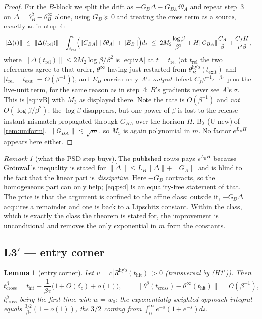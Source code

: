 \documentclass[11pt]{article}
\newtheorem{lemma}{Lemma}
\theoremstyle{definition}
\theoremstyle{remark}
\newtheorem{remark}{Remark}
\newcommand{\hyb}{\mathrm{hyb}}
\newcommand{\thit}{t_{\mathrm{hit}}}
\newcommand{\texit}{t_{\mathrm{exit}}}
\newcommand{\trel}{t_{\mathrm{rel}}}
\newcommand{\tcross}{t_{\mathrm{cross}}}
\begin{document}
\begin{proof}
For the $B$-block we split the drift as $-G_B\Delta-G_{BA}\delta\theta_A$ and
repeat step~3 on $\Delta=\theta_B^\beta-\theta_B^\infty$ alone, using
$G_B\succeq0$ and treating the cross term as a source, exactly as in step~4:
\[
\|\Delta(t)\|\ \le\ \|\Delta(\trel)\|
+\int_{\trel}^{t}\Bigl(\|G_{BA}\|\,\|\delta\theta_A\|+\|E_B\|\Bigr)ds
\ \le\ 2M_2\frac{\log\beta}{\beta^{2}}
+H\|G_{BA}\|\frac{C_A}{\beta}+\frac{C_fH}{v'\beta},
\]
where $\|\Delta(\trel)\|\le2M_2\log\beta/\beta^2$ is \eqref{eq:ivA} at $t=\trel$
(at $\trel$ the two references agree to that order, $\theta^\infty$ having just
restarted from $\theta_B^{\hyb}(\texit)$ and $|\trel-\texit|=O(\beta^{-1})$), and
$E_B$ carries only $A$'s \emph{output} defect $C_f\beta^{-1}e^{-\beta z}$ plus
the live-unit term, for the same reason as in step~4: $B$'s gradients never see
$A$'s $\sigma$. This is \eqref{eq:ivB} with $M_3$ as displayed there. Note the
rate is $O(\beta^{-1})$ and \emph{not} $O(\log\beta/\beta^2)$: the $\log\beta$
disappears, but one power of $\beta$ is lost to the release-instant mismatch
propagated through $G_{BA}$ over the horizon $H$. By (U-new) of
\cref{rem:uniform}, $\|G_{BA}\|\lesssim\sqrt m$, so $M_3$ is again polynomial in
$m$. No factor $e^{L_BH}$ appears here either.
\end{proof}

\begin{remark}[what the PSD step buys]\label{rem:psd}
The published route pays $e^{L_BH}$ because Gr\"onwall's inequality is stated for
$\|\dot\Delta\|\le L_B\|\Delta\|+\|G_A\|$ and is blind to the fact that the
linear part is \emph{dissipative}. Here $-G_B$ contracts, so the homogeneous part
can only help; \eqref{eq:psd} is an equality-free statement of that. The price is
that the argument is confined to the affine class: outside it, $-G_B\Delta$
acquires a remainder and one is back to a Lipschitz constant. Within the class,
which is exactly the class the theorem is stated for, the improvement is
unconditional and removes the only exponential in $m$ from the constants.
\end{remark}

\subsection*{L3$'$ --- entry corner}

\begin{lemma}[entry corner]\label{lem:corner-in}
Let $v=c|R^{\hyb}(\thit)|>0$ (transversal by (H1$'$)). Then
\begin{equation}\label{eq:corner-in}
\tcross^\beta=\thit+\frac{1}{\beta v}\bigl(1+O(\delta_z)+o(1)\bigr),
\qquad
\|\theta^\beta(\tcross)-\theta^\infty(\thit)\|=O(\beta^{-1}),
\end{equation}
$\tcross^\beta$ being the first time with $w=w_0$; the exponentially weighted
approach integral equals $\tfrac{3/2}{\beta v}(1+o(1))$, the $3/2$ coming from
$\int_0^\infty e^{-s}(1+e^{-s})ds$.
\end{lemma}
\end{document}

